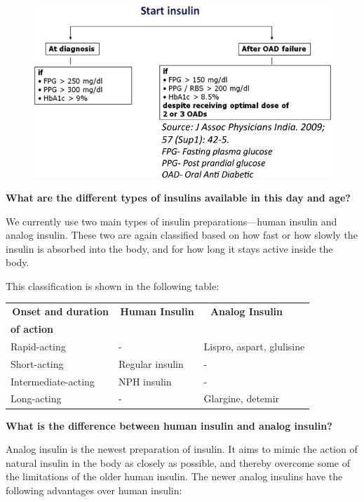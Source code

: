 \begin{figure}[h]
\centering
\includegraphics[scale=2.2]{images/088.jpg}
\end{figure}

\noindent\textbf{What are the different types of insulins available in this day and age?}

We currently use two main types of insulin preparations—human insulin and analog insulin. These two are again classified based on how fast or how slowly the insulin is absorbed into the body, and for how long it stays active inside the body.

This classification is shown in the following table:

{
\begin{center}
\small\addtolength{\tabcolsep}{-1pt}
\begin{tabular}{|l|l|l|}
\hline
\,\textbf{Onset and duration} & \,\textbf{Human Insulin} & \,\,\,\,\quad\textbf{Analog Insulin}\\
\qquad\textbf{of action} &  & \\
\hline
Rapid-acting & \quad\qquad- & Lispro, aspart, glulisine\\
\hline
Short-acting & Regular insulin & \qquad\qquad-\\
\hline
Intermediate-acting & NPH insulin & \qquad\qquad-\\
\hline
Long-acting & \quad\qquad- & Glargine, detemir\\
\hline
\end{tabular}
\end{center}
}\relax

\noindent\textbf{What is the difference between human insulin and analog insulin?}

Analog insulin is the newest preparation of insulin. It aims to mimic the action of natural insulin in the body as closely as possible, and thereby overcome some of the limitations of the older human insulin. The newer analog insulins have the following advantages over human insulin:

